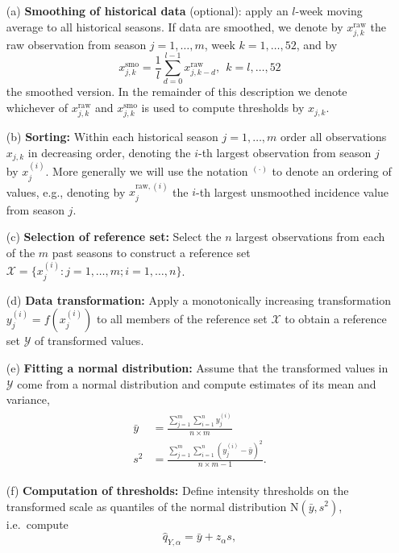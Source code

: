 \documentclass[12pt]{article}
\newcommand{\sd}{s}
\begin{document}
\begin{enumerate}
\item[(a)] \textbf{Smoothing of historical data} (optional): apply an $l$-week moving average to all historical seasons. If data are smoothed, we denote by $x^\text{raw}_{j, k}$ the raw observation from season $j = 1, \dots, m$, week $k = 1, \dots, 52$, and by
$$
x^\text{smo}_{j, k} = \frac{1}{l} \sum_{d = 0}^{l - 1} x^\text{raw}_{j, k - d}, \ \ k = l, \dots, 52
$$ the smoothed version. In the remainder of this description we denote whichever of $x^\text{raw}_{j, k}$ and $x^\text{smo}_{j, k}$ is used to compute thresholds by $x_{j, k}$.
\item[(b)] \textbf{Sorting:} Within each historical season $j = 1, \dots, m$ order all observations $x_{j, k}$ in decreasing order, denoting the $i$-th largest observation from season $j$ by $x^{(i)}_j$. More generally we will use the notation $^{(\cdot)}$ to denote an ordering of values, e.g., denoting by $x^{\text{raw}, (i)}_j$ the $i$-th largest unsmoothed incidence value from season $j$.
\item[(c)] \textbf{Selection of reference set:} Select the $n$ largest observations from each of the $m$ past seasons to construct a reference set $\mathcal{X} = \{x_j^{(i)}: j = 1, \dots, m; i = 1, \dots, n\}$.
\item[(d)] \textbf{Data transformation:} Apply a monotonically increasing transformation $y_j^{(i)} = f(x_j^{(i)})$ to all members of the reference set $\mathcal{X}$ to obtain a reference set $\mathcal{Y}$ of transformed values.
\item[(e)] \textbf{Fitting a normal distribution:} Assume that the transformed values in $\mathcal{Y}$ come from a normal distribution and compute estimates of its mean and variance,
\begin{align}
\begin{split}
\bar{y} & = \frac{\sum_{j = 1}^m\sum_{i = 1}^n y_j^{(i)}}{n\times m}\\
\sd^2 & = \frac{\sum_{j = 1}^m\sum_{i = 1}^n \left(y_j^{(i)}  - \bar{y}\right)^2}{n\times m - 1}.
\end{split}\label{eq:moments}
\end{align}
\item[(f)] \textbf{Computation of thresholds:} Define intensity thresholds on the transformed scale as quantiles of the normal distribution N$(\bar{y}, \sd^2)$, i.e.\ compute
\begin{equation}
\hat{q}_{Y, \alpha} = \bar{y} + z_\alpha \sd, \label{eq:def_q}
\end{equation}

\end{enumerate}
\end{document}
